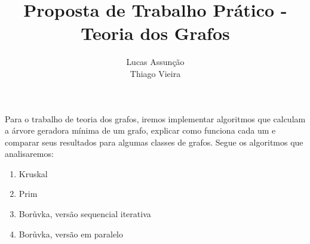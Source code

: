 \documentclass[11pt]{paper}
\title{\textbf{Proposta de Trabalho Prático - Teoria dos Grafos}}
\author{Lucas Assunção\\Thiago Vieira}
\date{}
\begin{document}
\maketitle

Para o trabalho de teoria dos grafos, iremos implementar algoritmos que calculam a árvore geradora mínima de um grafo, explicar como funciona cada um e comparar seus resultados para algumas classes de grafos. Segue os algoritmos que analisaremos:\\
\begin{enumerate}
\item Kruskal
\item Prim
\item Borůvka, versão sequencial iterativa
\item Borůvka, versão em paralelo
\end{enumerate}
\end{document}

